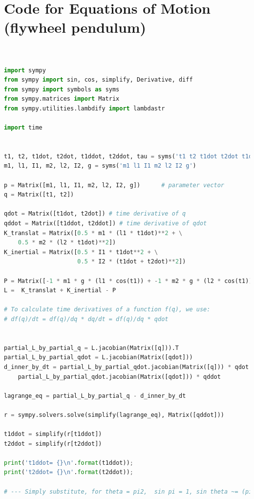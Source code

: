 \documentclass[conference]{IEEEtran}
\begin{document}
\section{Code for Equations of Motion (flywheel pendulum)}
\lstset{basicstyle=\footnotesize\ttfamily,breaklines=true}
\begin{lstlisting}[language=Python,frame=single]  % Start your code-block


import sympy
from sympy import sin, cos, simplify, Derivative, diff
from sympy import symbols as syms
from sympy.matrices import Matrix
from sympy.utilities.lambdify import lambdastr

import time


t1, t2, t1dot, t2dot, t1ddot, t2ddot, tau = syms('t1 t2 t1dot t2dot t1ddot t2ddot tau')
m1, l1, I1, m2, l2, I2, g = syms('m1 l1 I1 m2 l2 I2 g')

p = Matrix([m1, l1, I1, m2, l2, I2, g])      # parameter vector
q = Matrix([t1, t2])

qdot = Matrix([t1dot, t2dot]) # time derivative of q
qddot = Matrix([t1ddot, t2ddot]) # time derivative of qdot
K_translat = Matrix([0.5 * m1 * (l1 * t1dot)**2 + \
    0.5 * m2 * (l2 * t1dot)**2])
K_inertial = Matrix([0.5 * I1 * t1dot**2 + \
                     0.5 * I2 * (t1dot + t2dot)**2])

P = Matrix([-1 * m1 * g * (l1 * cos(t1)) + -1 * m2 * g * (l2 * cos(t1))])
L =  K_translat + K_inertial - P

# To calculate time derivatives of a function f(q), we use:
# df(q)/dt = df(q)/dq * dq/dt = df(q)/dq * qdot


partial_L_by_partial_q = L.jacobian(Matrix([q])).T
partial_L_by_partial_qdot = L.jacobian(Matrix([qdot]))
d_inner_by_dt = partial_L_by_partial_qdot.jacobian(Matrix([q])) * qdot + \
    partial_L_by_partial_qdot.jacobian(Matrix([qdot])) * qddot

lagrange_eq = partial_L_by_partial_q - d_inner_by_dt

r = sympy.solvers.solve(simplify(lagrange_eq), Matrix([qddot]))

t1ddot = simplify(r[t1ddot])
t2ddot = simplify(r[t2ddot])

print('t1ddot= {}\n'.format(t1ddot));
print('t2ddot= {}\n'.format(t2ddot));

# --- Simply substitute, for theta = pi2,  sin pi = 1, sin theta ~= (pi - theta )

\end{lstlisting}


\end{document}
